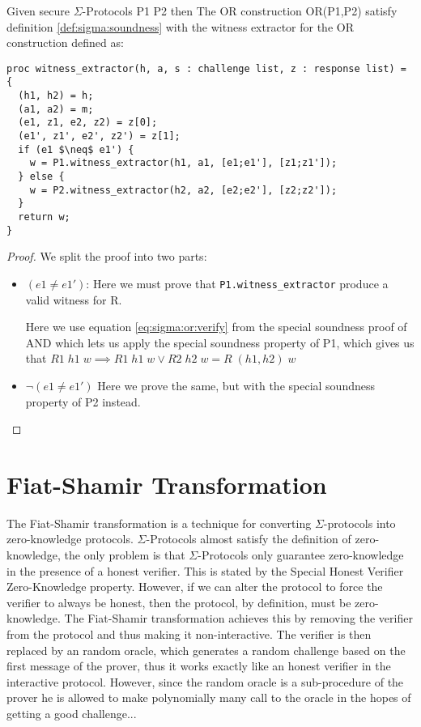 \begin{lemma}
  Given secure $\Sigma$-Protocols P1 P2 then
  The OR construction OR(P1,P2) satisfy definition \ref{def:sigma:soundness} with the
  witness extractor for the OR construction defined as:
\begin{lstlisting}[mathescape]
proc witness_extractor(h, a, s : challenge list, z : response list) = {
  (h1, h2) = h;
  (a1, a2) = m;
  (e1, z1, e2, z2) = z[0];
  (e1', z1', e2', z2') = z[1];
  if (e1 $\neq$ e1') {
    w = P1.witness_extractor(h1, a1, [e1;e1'], [z1;z1']);
  } else {
    w = P2.witness_extractor(h2, a2, [e2;e2'], [z2;z2']);
  }
  return w;
}
\end{lstlisting}

\end{lemma}
\begin{proof}
  We split the proof into two parts:
  \begin{itemize}
    \item $(e1 \neq e1')$: Here we must prove that \texttt{P1.witness\_extractor} produce a valid witness for R.

      Here we use equation \ref{eq:sigma:or:verify} from the special soundness
      proof of AND which lets us apply the
      special soundness property of P1, which gives us that
      $R1 \; h1 \; w \implies R1 \; h1 \; w \lor R2 \; h2 \; w = R \; (h1, h2) \; w$
    \item $\neg(e1 \neq e1')$ Here we prove the same, but with the special
      soundness property of P2 instead.
  \end{itemize}
\end{proof}

\section{Fiat-Shamir Transformation}
\label{subsec:fiat-shamir}
The Fiat-Shamir transformation is a technique for converting $\Sigma$-protocols
into zero-knowledge protocols. $\Sigma$-Protocols almost satisfy the definition
of zero-knowledge, the only problem is that $\Sigma$-Protocols only guarantee
zero-knowledge in the presence of a honest verifier. This is stated by the Special
Honest Verifier Zero-Knowledge property. However, if we can alter the protocol
to force the verifier to always be honest, then the protocol, by definition,
must be zero-knowledge.
The Fiat-Shamir transformation achieves this by removing the verifier from the
protocol and thus making it non-interactive. The verifier is then replaced by an
random oracle, which generates a random challenge based on the first message of
the prover, thus it works exactly like an honest verifier in the interactive
protocol. However, since the random oracle is a sub-procedure of the prover he
is allowed to make polynomially many call to the oracle in the hopes of getting
a good challenge... 

